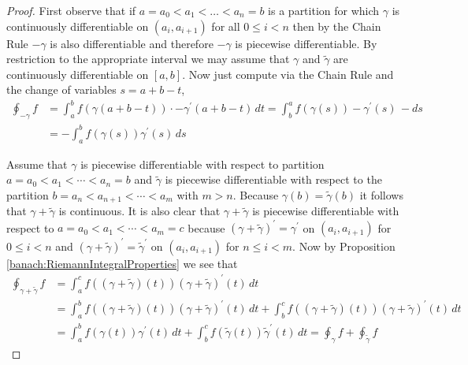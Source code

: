 \begin{proof}
First observe that if $a=a_0 < a_1 < \dotsc < a_n=b$ is a partition for which $\gamma$ is continuously differentiable on $(a_i, a_{i+1})$ for all $0 \leq i < n$ then by the Chain Rule $-\gamma$ is also differentiable and therefore $-\gamma$ is piecewise differentiable.   By restriction to the appropriate interval we may assume that $\gamma$ and $\tilde{\gamma}$ are continuously differentiable on $[a,b]$.   Now just compute via the Chain Rule and the change of variables $s = a + b - t$,
\begin{align*}
\oint_{-\gamma} f &= \int_a^b f(\gamma(a + b -t)) \cdot -\gamma^\prime(a + b -t) \, dt = \int_b^a f(\gamma(s)) -\gamma^\prime(s) \, -ds \\
&= -\int_a^b f(\gamma(s)) \gamma^\prime(s) \, ds 
\end{align*}

Assume that $\gamma$ is piecewise differentiable with respect to partition $a=a_0 < a_1 < \cdots < a_n =b $ and $\tilde{\gamma}$ is piecewise differentiable with respect to the partition $b=a_n < a_{n+1} < \cdots < a_m$ with $m > n$.   Because $\gamma(b) = \tilde{\gamma}(b)$ it follows that $\gamma + \tilde{\gamma}$ is continuous.   It is also clear that $\gamma + \tilde{\gamma}$ is piecewise differentiable with respect to $a=a_0 < a_1 < \cdots < a_m = c$ because $\left(\gamma + \tilde{\gamma} \right)^\prime = \gamma^\prime$ on $(a_i, a_{i+1})$ for $0 \leq i < n$ and
$\left(\gamma + \tilde{\gamma} \right)^\prime = \tilde{\gamma}^\prime$ on $(a_i, a_{i+1})$ for $n \leq i < m$.   Now by Proposition \ref{banach:RiemannIntegralProperties} we see that
\begin{align*}
\oint_{\gamma + \tilde{\gamma}} f &= \int_a^c f\left(\left(\gamma + \tilde{\gamma}\right)(t)\right) \left(\gamma + \tilde{\gamma} \right)^\prime(t) \, dt \\
&=\int_a^b f\left(\left(\gamma + \tilde{\gamma}\right)(t)\right) \left(\gamma + \tilde{\gamma} \right)^\prime(t) \, dt  + \int_b^c f\left(\left(\gamma + \tilde{\gamma}\right)(t)\right) \left(\gamma + \tilde{\gamma} \right)^\prime(t) \, dt \\
&=\int_a^b f\left(\gamma(t)\right) \gamma^\prime(t) \, dt + \int_b^c f\left(\tilde{\gamma}(t)\right) \tilde{\gamma}^\prime(t) \, dt = \oint_{\gamma} f + \oint_{\tilde{\gamma}} f
\end{align*}
\end{proof}

